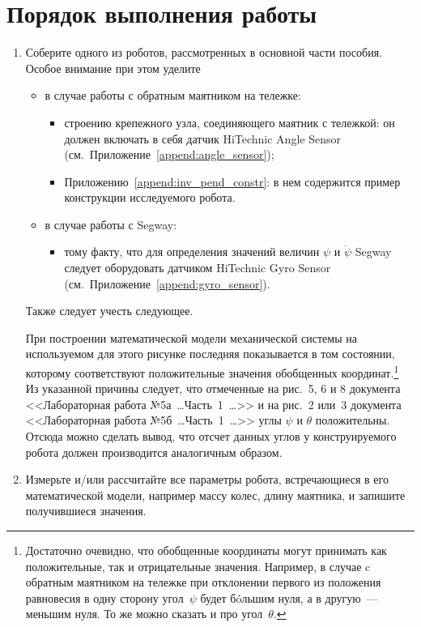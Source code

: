 \documentclass[12pt,a4paper,openany]{extarticle}
\begin{document}
\section{Порядок выполнения работы}
\begin{enumerate}
	\item Соберите одного из роботов, рассмотренных в основной части пособия. Особое внимание при этом уделите 
	\begin{itemize}
	\item в случае работы с обратным маятником на тележке:
	\begin{itemize}
	\item строению крепежного узла, соединяющего маятник с тележкой: он должен включать в себя датчик HiTechnic Angle Sensor (см.~Приложение~\ref{append:angle_sensor});
	\item Приложению~\ref{append:inv_pend_constr}: в нем содержится пример конструкции исследуемого робота.
	\end{itemize}
	\item в случае работы с Segway:
	\begin{itemize}
	\item тому факту, что для определения значений величин $\psi$ и $\dot\psi$ Segway следует оборудовать датчиком HiTechnic Gyro Sensor (см.~Приложение~\ref{append:gyro_sensor}).
	\end{itemize}
	\end{itemize}	
	
	Также следует учесть следующее. 
	
	При построении математической модели механической системы на используемом для этого рисунке последняя показывается в том состоянии, которому соответствуют положительные значения обобщенных координат\lefteqn.\footnote{Достаточно очевидно, что обобщенные координаты могут принимать как положительные, так и отрицательные значения. Например, в случае c обратным маятником на тележке при отклонении первого из положения равновесия в одну сторону угол~$\psi$ будет б\'oльшим нуля, а в другую~--- меньшим нуля. То же можно сказать и про угол~$\theta$.} Из указанной причины следует, что отмеченные на рис.~5, 6 и 8 документа <<Лабораторная работа №5а~\dots Часть~1~\dots>> и на рис.~2 или~3 документа <<Лабораторная работа №5б~\dots Часть~1~\dots>> углы $\psi$ и $\theta$ положительны. Отсюда можно сделать вывод, что отсчет данных углов у конструируемого робота должен производится аналогичным образом. 
	
	\item Измерьте и/или рассчитайте все параметры робота, встречающиеся в его математической модели, например массу колес, длину маятника, и запишите получившиеся значения.
	

\end{enumerate}
\end{document}
